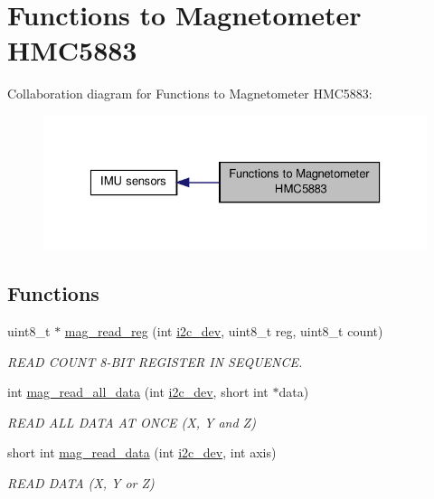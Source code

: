 \hypertarget{group__mag}{\section{Functions to Magnetometer H\-M\-C5883}
\label{group__mag}
}
Collaboration diagram for Functions to Magnetometer H\-M\-C5883\-:
\nopagebreak
\begin{figure}[H]
\begin{center}
\leavevmode
\includegraphics[width=326pt]{group__mag}
\end{center}
\end{figure}
\subsection*{Functions}
\begin{DoxyCompactItemize}
\item 
uint8\-\_\-t $\ast$ \hyperlink{group__mag_ga6830eaeae2298320e1e8c902e4edd709}{mag\-\_\-read\-\_\-reg} (int \hyperlink{CommunicationV0_2communication_8c_a7751bd45ac1064efb35adf1f19c25db8}{i2c\-\_\-dev}, uint8\-\_\-t reg, uint8\-\_\-t count)
\begin{DoxyCompactList}\small\item\em R\-E\-A\-D C\-O\-U\-N\-T 8-\/\-B\-I\-T R\-E\-G\-I\-S\-T\-E\-R I\-N S\-E\-Q\-U\-E\-N\-C\-E. \end{DoxyCompactList}\item 
int \hyperlink{group__mag_gab42ae0d0a2a6f37cf36d856c072b7f34}{mag\-\_\-read\-\_\-all\-\_\-data} (int \hyperlink{CommunicationV0_2communication_8c_a7751bd45ac1064efb35adf1f19c25db8}{i2c\-\_\-dev}, short int $\ast$data)
\begin{DoxyCompactList}\small\item\em R\-E\-A\-D A\-L\-L D\-A\-T\-A A\-T O\-N\-C\-E (X, Y and Z) \end{DoxyCompactList}\item 
short int \hyperlink{group__mag_ga542a31ccd07cd2c3e8e2b68cdb6d219e}{mag\-\_\-read\-\_\-data} (int \hyperlink{CommunicationV0_2communication_8c_a7751bd45ac1064efb35adf1f19c25db8}{i2c\-\_\-dev}, int axis)
\begin{DoxyCompactList}\small\item\em R\-E\-A\-D D\-A\-T\-A (X, Y or Z) \end{DoxyCompactList}\end{DoxyCompactItemize}


